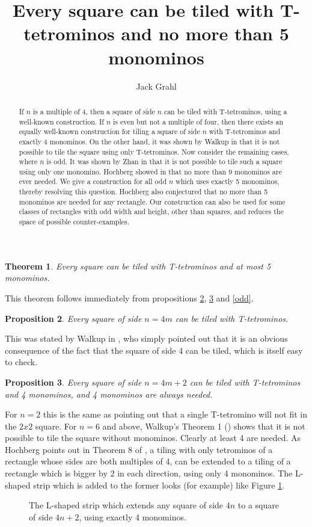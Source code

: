 \documentclass{article}
\title{Every square can be tiled with T-tetrominos and no more than 5 monominos}
\author{Jack Grahl}
\theoremstyle{plain}
\newtheorem{theorem}{Theorem}[section]
\newtheorem{proposition}[theorem]{Proposition}
\begin{document}
\maketitle

\begin{abstract}
If $n$ is a multiple of 4, then a square of side $n$ can be tiled with T-tetrominos, using a well-known construction.
If $n$ is even but not a multiple of four, then there exists an equally well-known construction for tiling a square of side $n$ with T-tetrominos and exactly 4 monominos.
On the other hand, it was shown by Walkup in \cite{walkup} that it is not possible to tile the square using only T-tetrominos.
Now consider the remaining cases, where $n$ is odd.
It was shown by Zhan in \cite{zhan} that it is not possible to tile such a square using only one monomino.
Hochberg showed in \cite{hochberg} that no more than 9 monominos are ever needed.
We give a construction for all odd $n$ which uses exactly 5 monominos, thereby resolving this question.
Hochberg also conjectured that no more than 5 monominos are needed for any rectangle.
Our construction can also be used for some classes of rectangles with odd width and height, other than squares, and reduces the space of possible counter-examples.
\end{abstract}

\begin{theorem}
Every square can be tiled with T-tetrominos and at most 5 monominos.
\end{theorem}
This theorem follows immediately from propositions \ref{four}, \ref{even} and \ref{odd}.

\begin{proposition}\label{four}
Every square of side $n = 4m$ can be tiled with T-tetrominos.
\end{proposition}
This was stated by Walkup in \cite{walkup}, who simply pointed out that it is an obvious consequence of the fact that the square of side 4 can be tiled, which is itself easy to check.

\begin{proposition}\label{even}
Every square of side $n = 4m + 2$ can be tiled with T-tetrominos and 4 monominos, and 4 monominos are always needed.
\end{proposition}
For $n = 2$ this is the same as pointing out that a single T-tetromino will not fit in the $2x2$ square.
For $n=6$ and above, Walkup's Theorem 1 (\cite{walkup}) shows that it is not possible to tile the square without monominos.
Clearly at least 4 are needed.
As Hochberg points out in Theorem 8 of \cite{hochberg}, a tiling with only tetrominos of a rectangle whose sides are both multiples of 4, can be extended to a tiling of a rectangle which is bigger by 2 in each direction, using only 4 monominos.
The L-shaped strip which is added to the former looks (for example) like Figure \ref{lshaped}.

\begin{figure}\label{lshaped}

\caption{The L-shaped strip which extends any square of side $4n$ to a square of side $4n+2$, using exactly 4 monominos.}
\end{figure}

{}

\end{document}

